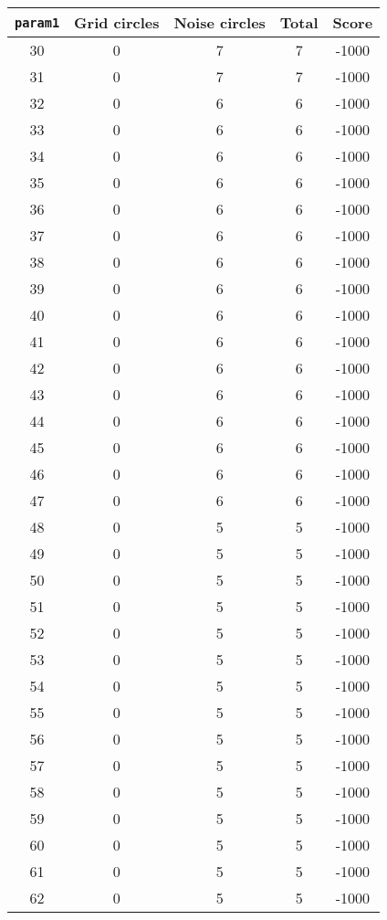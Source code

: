 \documentclass[letterpaper, 12pt]{article}
\begin{document}
\begin{longtable}{|c|c|c|c|c|}
\hline
\textbf{\texttt{param1}} & \textbf{Grid circles} & \textbf{Noise circles} & \textbf{Total} & \textbf{Score} \\
\hline
30 & 0 & 7 & 7 & -1000 \\
\hline
31 & 0 & 7 & 7 & -1000 \\
\hline
32 & 0 & 6 & 6 & -1000 \\
\hline
33 & 0 & 6 & 6 & -1000 \\
\hline
34 & 0 & 6 & 6 & -1000 \\
\hline
35 & 0 & 6 & 6 & -1000 \\
\hline
36 & 0 & 6 & 6 & -1000 \\
\hline
37 & 0 & 6 & 6 & -1000 \\
\hline
38 & 0 & 6 & 6 & -1000 \\
\hline
39 & 0 & 6 & 6 & -1000 \\
\hline
40 & 0 & 6 & 6 & -1000 \\
\hline
41 & 0 & 6 & 6 & -1000 \\
\hline
42 & 0 & 6 & 6 & -1000 \\
\hline
43 & 0 & 6 & 6 & -1000 \\
\hline
44 & 0 & 6 & 6 & -1000 \\
\hline
45 & 0 & 6 & 6 & -1000 \\
\hline
46 & 0 & 6 & 6 & -1000 \\
\hline
47 & 0 & 6 & 6 & -1000 \\
\hline
48 & 0 & 5 & 5 & -1000 \\
\hline
49 & 0 & 5 & 5 & -1000 \\
\hline
50 & 0 & 5 & 5 & -1000 \\
\hline
51 & 0 & 5 & 5 & -1000 \\
\hline
52 & 0 & 5 & 5 & -1000 \\
\hline
53 & 0 & 5 & 5 & -1000 \\
\hline
54 & 0 & 5 & 5 & -1000 \\
\hline
55 & 0 & 5 & 5 & -1000 \\
\hline
56 & 0 & 5 & 5 & -1000 \\
\hline
57 & 0 & 5 & 5 & -1000 \\
\hline
58 & 0 & 5 & 5 & -1000 \\
\hline
59 & 0 & 5 & 5 & -1000 \\
\hline
60 & 0 & 5 & 5 & -1000 \\
\hline
61 & 0 & 5 & 5 & -1000 \\
\hline
62 & 0 & 5 & 5 & -1000 \\

\end{longtable}
\end{document}
